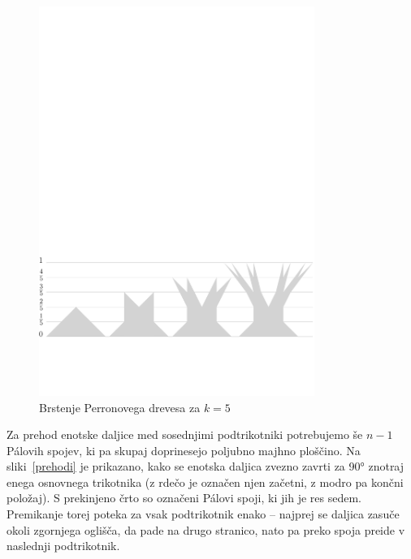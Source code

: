 \documentclass[a4paper, 12pt]{article}
\begin{document}
\begin{figure}[h!]
    \centering
    \includegraphics[width=0.8\textwidth]{ipe_slike/perronova_drevesa.pdf}
    \caption{Brstenje Perronovega drevesa za $ k = 5 $}
    \label{brstenje}
\end{figure}

Za prehod enotske daljice med sosednjimi podtrikotniki potrebujemo še $ n-1 $ Pálovih spojev, ki pa skupaj doprinesejo poljubno majhno ploščino. Na sliki~\ref{prehodi} je prikazano, kako se enotska daljica zvezno zavrti za 90° znotraj enega osnovnega trikotnika (z rdečo je označen njen začetni, z modro pa končni položaj). S prekinjeno črto so označeni Pálovi spoji, ki jih je res sedem. Premikanje torej poteka za vsak podtrikotnik enako -- najprej se daljica zasuče okoli zgornjega oglišča, da pade na drugo stranico, nato pa preko spoja preide v naslednji podtrikotnik.
\end{document}
